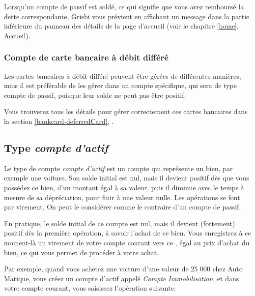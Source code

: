 Lorsqu'un compte de passif est soldé, ce qui signifie que vous avez remboursé la dette correspondante, Grisbi vous prévient en affichant un message dans la partie inférieure du panneau des détails de la page d'accueil (voir le chapitre \vref{home}, Accueil). %




\subsubsection{Compte de carte bancaire à débit différé\label{accounts-type-cash-deferredCards}}

Les cartes bancaires à débit différé peuvent être gérées de différentes manières, mais il est préférable de les gérer dans un compte spécifique, qui sera de type compte de passif, puisque leur solde ne peut pas être positif.

Vous trouverez tous les détails pour gérer correctement ces cartes bancaires dans la section \vref{bankcard-deferredCard}, .


\subsection{Type \emph{compte d'actif}\label{accounts-type-assets}}

Le type de compte \emph{compte d'actif} est un compte qui représente un bien, par exemple une voiture. Son solde initial est nul, mais il devient positif dès que vous possédez ce bien, d'un montant égal à sa valeur, puis il diminue avec le temps à mesure de sa dépréciation, pour finir à une valeur nulle. Les opérations se font par virement. On peut le considérer comme le contraire d'un compte de passif.

En pratique, le solde initial de ce compte est nul, mais il devient (fortement) positif dès la première opération, à savoir l'achat de ce bien. Vous enregistrez à ce moment-là un virement de votre compte courant vers ce , égal au prix d'achat du bien, ce qui vous permet de procéder à votre achat.

Par exemple, quand vous achetez une voiture d'une valeur de 25 000 \texteuro{} chez Auto Matique, vous créez un compte d'actif appelé \emph{Compte Immobilisation}, et dans votre compte courant, vous saisissez l'opération suivante: 

